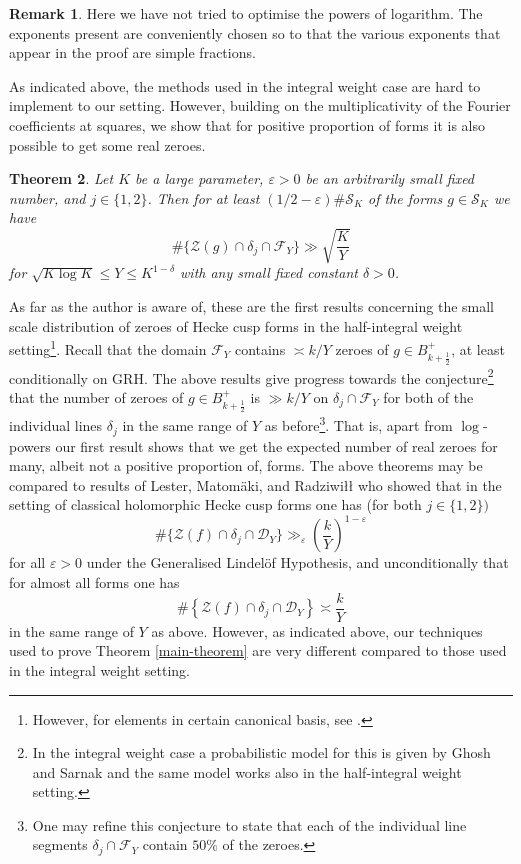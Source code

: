\documentclass[a4paper,10pt,twoside]{amsart}
\newtheorem{theorem}{Theorem}[section]
\theoremstyle{definition}
\newtheorem{rem}[theorem]{Remark}
\numberwithin{equation}{section}
\newcommand\eps{\varepsilon}
\renewcommand\:{\colon}
\begin{document}
\begin{rem}
Here we have not tried to optimise the powers of logarithm. The exponents present are conveniently chosen so to that the various exponents that appear in the proof are simple fractions.  
\end{rem}

\noindent As indicated above, the methods used in the integral weight case are hard to implement to our setting. However, building on the multiplicativity of the Fourier coefficients at squares, we show that for positive proportion of forms it is also possible to get some real zeroes.

\begin{theorem}\label{second-main-theorem}
Let $K$ be a large parameter, $\eps>0$ be an arbitrarily small fixed number, and $j\in\{1,2\}$. Then for at least $(1/2-\eps)\#\mathcal S_K$ of the forms $g\in\mathcal S_K$ we have 
\[\#\{\mathcal Z(g)\cap\delta_j\cap\mathcal F_Y\}\gg\sqrt{\frac K{Y}} \]
for $\sqrt{K\log K}\leq Y\leq K^{1-\delta}$ with any small fixed constant $\delta>0$. 
\end{theorem}

\noindent As far as the author is aware of, these are the first results concerning the small scale distribution of zeroes of Hecke cusp forms in the half-integral weight setting\footnote{However, for elements in certain canonical basis, see \cite{Folsom-Jenkins2016}.}. Recall that the domain $\mathcal F_Y$ contains $\asymp k/Y$ zeroes of $g\in B_{k+\frac12}^+$, at least conditionally on GRH. The above results give progress towards the conjecture\footnote{In the integral weight case a probabilistic model for this is given by Ghosh and Sarnak \cite[Section 6]{Ghosh-Sarnak2012} and the same model works also in the half-integral weight setting.} that the number of zeroes of $g\in B^+_{k+\frac12}$ is $\gg k/Y$ on $\delta_j\cap \mathcal F_Y$ for both of the individual lines $\delta_j$ in the same range of $Y$ as before\footnote{One may refine this conjecture to state that each of the individual line segments $\delta_j\cap\mathcal F_Y$ contain $50\%$ of the zeroes.}. That is, apart from $\log$-powers our first result shows that we get the expected number of real zeroes for many, albeit not a positive proportion of, forms. The above theorems may be compared to results of Lester, Matom\"aki, and Radziwi{\l\l} \cite{Lester-Matomaki-Radziwill2018} who showed that in the setting of classical holomorphic Hecke cusp forms one has (for both $j\in\{1,2\})$
\[\#\{\mathcal Z(f)\cap\delta_j\cap \mathcal D_Y\}\gg_\eps\left(\frac k{Y}\right)^{1-\varepsilon}\]
for all $\varepsilon>0$ under the Generalised Lindel\"of Hypothesis, and unconditionally that for almost all forms one has
\[\#\left\{\mathcal Z(f)\cap\delta_j\cap\mathcal D_Y\right\}\asymp\frac kY \] 
in the same range of $Y$ as above. However, as indicated above, our techniques used to prove Theorem \ref{main-theorem} are very different compared to those used in the integral weight setting. 
\end{document}
